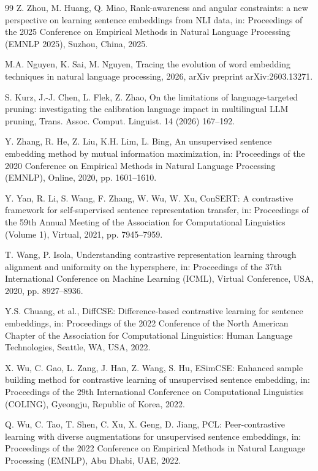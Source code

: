 \documentclass[lettersize,journal]{IEEEtran}
\begin{document}
\begin{thebibliography}{99}
Z. Zhou, M. Huang, Q. Miao, Rank-awareness and angular constraints: a new perspective on learning sentence embeddings from NLI data, in: Proceedings of the 2025 Conference on Empirical Methods in Natural Language Processing (EMNLP 2025), Suzhou, China, 2025.

M.A. Nguyen, K. Sai, M. Nguyen, Tracing the evolution of word embedding techniques in natural language processing, 2026, arXiv preprint arXiv:2603.13271.

S. Kurz, J.-J. Chen, L. Flek, Z. Zhao, On the limitations of language-targeted pruning: investigating the calibration language impact in multilingual LLM pruning, Trans. Assoc. Comput. Linguist. 14 (2026) 167--192.

Y. Zhang, R. He, Z. Liu, K.H. Lim, L. Bing, An unsupervised sentence embedding method by mutual information maximization, in: Proceedings of the 2020 Conference on Empirical Methods in Natural Language Processing (EMNLP), Online, 2020, pp. 1601--1610.

Y. Yan, R. Li, S. Wang, F. Zhang, W. Wu, W. Xu, ConSERT: A contrastive framework for self-supervised sentence representation transfer, in: Proceedings of the 59th Annual Meeting of the Association for Computational Linguistics (Volume 1), Virtual, 2021, pp. 7945--7959.

T. Wang, P. Isola, Understanding contrastive representation learning through alignment and uniformity on the hypersphere, in: Proceedings of the 37th International Conference on Machine Learning (ICML), Virtual Conference, USA, 2020, pp. 8927--8936.

Y.S. Chuang, et al., DiffCSE: Difference-based contrastive learning for sentence embeddings, in: Proceedings of the 2022 Conference of the North American Chapter of the Association for Computational Linguistics: Human Language Technologies, Seattle, WA, USA, 2022.

X. Wu, C. Gao, L. Zang, J. Han, Z. Wang, S. Hu, ESimCSE: Enhanced sample building method for contrastive learning of unsupervised sentence embedding, in: Proceedings of the 29th International Conference on Computational Linguistics (COLING), Gyeongju, Republic of Korea, 2022.

Q. Wu, C. Tao, T. Shen, C. Xu, X. Geng, D. Jiang, PCL: Peer-contrastive learning with diverse augmentations for unsupervised sentence embeddings, in: Proceedings of the 2022 Conference on Empirical Methods in Natural Language Processing (EMNLP), Abu Dhabi, UAE, 2022.


\end{thebibliography}
\end{document}
